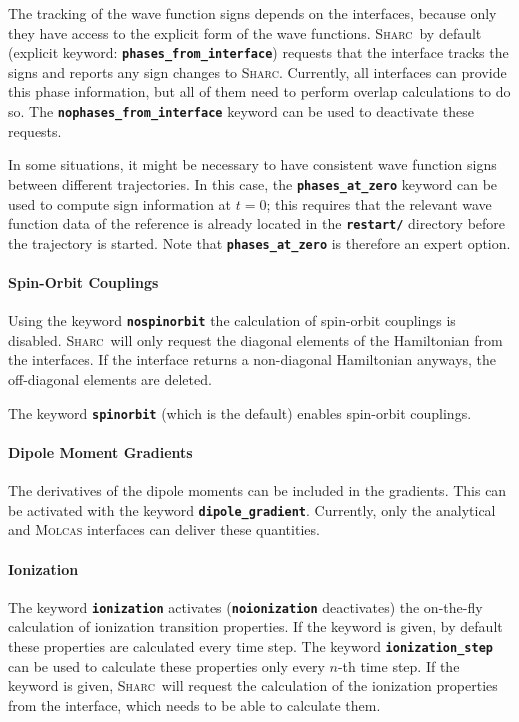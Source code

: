 \documentclass[a4paper,10pt,DIV=15,openany]{scrbook}
\newcommand{\sharc}{\textsc{Sharc}}
\newcommand{\ttt}[1]{\textbf{\texttt{#1}}}
\begin{document}
The tracking of the wave function signs depends on the interfaces, because only they have access to the explicit form of the wave functions. \sharc\ by default (explicit keyword: \ttt{phases\_from\_interface}) requests that the interface tracks the signs and reports any sign changes to \sharc. Currently, all interfaces can provide this phase information, but all of them need to perform overlap calculations to do so. The \ttt{nophases\_from\_interface} keyword can be used to deactivate these requests.

In some situations, it might be necessary to have consistent wave function signs between different trajectories. In this case, the \ttt{phases\_at\_zero} keyword can be used to compute sign information at $t=0$; this requires that the relevant wave function data of the reference is already located in the \ttt{restart/} directory before the trajectory is started. Note that \ttt{phases\_at\_zero} is therefore an expert option.

\paragraph{Spin-Orbit Couplings}

Using the keyword \ttt{nospinorbit} the calculation of spin-orbit couplings is disabled. \sharc\ will only request the diagonal elements of the Hamiltonian from the interfaces. If the interface returns a non-diagonal Hamiltonian anyways, the off-diagonal elements are deleted.

The keyword \ttt{spinorbit} (which is the default) enables spin-orbit couplings.

\paragraph{Dipole Moment Gradients}

The derivatives of the dipole moments can be included in the gradients. This can be activated with the keyword \ttt{dipole\_gradient}. Currently, only the analytical and \textsc{Molcas} interfaces can deliver these quantities.

\paragraph{Ionization}

The keyword \ttt{ionization} activates (\ttt{noionization} deactivates) the on-the-fly calculation of ionization transition properties. If the keyword is given, by default these properties are calculated every time step. The keyword \ttt{ionization\_step} can be used to calculate these properties only every $n$-th time step. 
If the keyword is given, \sharc\ will request the calculation of the ionization properties from the interface, which needs to be able to calculate them.
\end{document}
